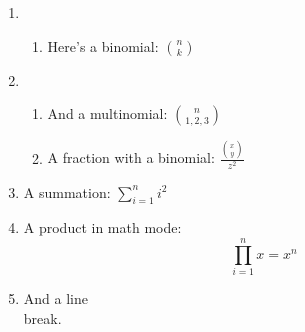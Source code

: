 \documentclass{article}
\begin{document}
\thispagestyle{fancy} %

\begin{enumerate}


	\item 
	
	\begin{enumerate}
		
		\item Here's a binomial: ${n \choose k}$
	
	\end{enumerate}

	\item 
	
	\begin{enumerate}
		
		\item And a multinomial: ${n \choose 1, 2, 3}$
		
		\item A fraction with a binomial: $\frac{{x \choose y}}{z^2}$
	
	\end{enumerate}
	
	\item A summation: $\sum\limits_{i=1}^n i^2$
	
	\item A product in math mode: \[\prod\limits_{i=1}^n x = x^n\]
	
	\item And a line \\ break.


\end{enumerate}

\newpage
\end{document}
